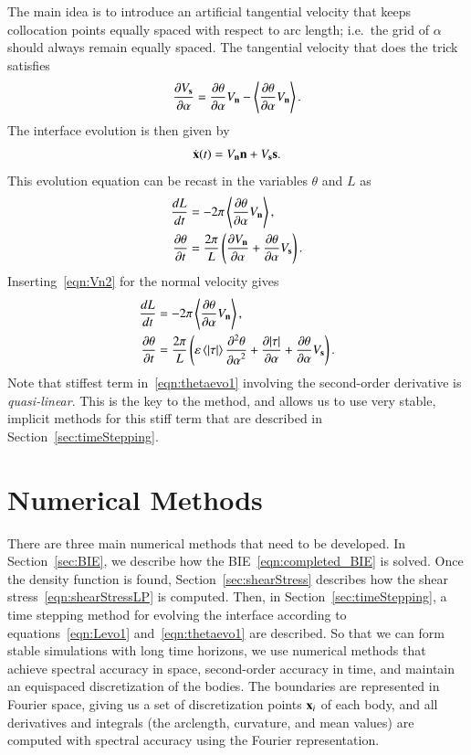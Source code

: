 \documentclass[preprint, 10pt]{elsarticle}
\begin{document}
The main idea is to introduce an artificial tangential velocity that
keeps collocation points equally spaced with respect to arc length;
i.e.~the grid of $\alpha$ should always remain equally spaced. The
tangential velocity that does the trick satisfies~\cite{hou-low-she1994}
\begin{align*}
\frac{\partial V_{\mathbf{s}}}{\partial \alpha} = \frac{\partial \theta}{\partial \alpha} V_{\mathbf{n}} - \left< \frac{\partial \theta}{\partial \alpha} V_{\mathbf{n}} \right>.
\end{align*}
The interface evolution is then given by
\begin{align*}
\dot{{\mathbf{x}}}(t) = V_{\mathbf{n}} {\mathbf{n}} + V_{\mathbf{s}} {\mathbf{s}}.
\end{align*}
This evolution equation can be recast in the variables $\theta$ and $L$
as
\begin{align*}
\frac{d L}{d t} &= - 2 \pi \left< \frac{\partial \theta}{\partial \alpha} V_{\mathbf{n}} \right>, \\
\frac{\partial \theta}{\partial t} &= \frac{2 \pi}{L} \left( \frac{\partial V_{\mathbf{n}}}{\partial \alpha} +
\frac{\partial \theta}{\partial \alpha} V_{\mathbf{s}} \right).
\end{align*}
Inserting~\eqref{eqn:Vn2} for the normal velocity gives
\begin{align}
\label{eqn:Levo1}
\frac{d L}{d t} &= - 2 \pi \left< \frac{\partial \theta}{\partial \alpha} V_{\mathbf{n}} \right>, \\
\label{eqn:thetaevo1}
\frac{\partial \theta}{\partial t} &= \frac{2\pi}{L} \left(
\varepsilon \left< \lvert \tau \rvert \right> \frac{\partial^2 \theta}{{\partial \alpha}^2} + \frac{\partial \lvert \tau \rvert}{\partial \alpha} +
\frac{\partial \theta}{\partial \alpha} V_{\mathbf{s}} \right).
\end{align}
Note that stiffest term in~\eqref{eqn:thetaevo1} involving the
second-order derivative is {\em quasi-linear}. This is the key to the
{\thL} method, and allows us to use very stable, implicit methods for
this stiff term that are described in Section~\ref{sec:timeStepping}. 


\section{Numerical Methods}
\label{s:method}
There are three main numerical methods that need to be developed.  In
Section~\ref{sec:BIE}, we describe how the BIE~\eqref{eqn:completed_BIE}
is solved.  Once the density function is found,
Section~\ref{sec:shearStress} describes how the shear
stress~\eqref{eqn:shearStressLP} is computed.  Then, in
Section~\ref{sec:timeStepping}, a time stepping method for evolving the
interface according to equations~\eqref{eqn:Levo1}
and~\eqref{eqn:thetaevo1} are described. So that we can form stable
simulations with long time horizons, we use numerical methods that
achieve spectral accuracy in space, second-order accuracy in time, and
maintain an equispaced discretization of the bodies.  The boundaries are
represented in Fourier space, giving us a set of discretization points
${\mathbf{x}}_i$ of each body, and all derivatives and integrals (the arclength,
curvature, and mean values) are computed with spectral accuracy using
the Fourier representation.
\end{document}
